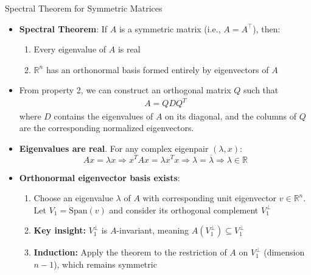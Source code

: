 \begin{frame}{Spectral Theorem for Symmetric Matrices}
\begin{itemize}
    \item  \textbf{Spectral Theorem}: If \( A \) is a symmetric matrix (i.e., \( A = A^\top \)), then:
     \begin{enumerate}
          \item Every eigenvalue of \( A \) is real
          \item \( \mathbb{R}^n \) has an orthonormal basis formed entirely by eigenvectors of \( A \)
     \end{enumerate}
     \item  From property 2, we can construct an orthogonal matrix $Q$ such that 
          \begin{align}
                A = Q D Q^T
          \end{align}
          where $D$ contains the eigenvalues of $A$ on its diagonal, and the columns of $Q$ are the corresponding normalized eigenvectors.
\end{itemize}
\end{frame}
\begin{frame}{}
\begin{itemize}
     \item \textbf{Eigenvalues are real}. For any complex eigenpair $(\lambda, x)$:
     \[
     Ax = \lambda x \Rightarrow x^T A x = \lambda x^T x \Rightarrow \lambda = \overline{\lambda} \Rightarrow \lambda \in \mathbb{R}
     \]
     \item \textbf{Orthonormal eigenvector basis exists}:
     \begin{enumerate}
          \item  Choose an eigenvalue \( \lambda \) of \( A \) with corresponding unit eigenvector \( v \in \mathbb{R}^n \). Let \( V_1 = \text{Span}(v) \) and consider its orthogonal complement \( V_1^\perp \)

          \item \textbf{Key insight:} \( V_1^\perp \) is \( A \)-invariant, meaning \( A(V_1^\perp) \subseteq V_1^\perp \)
          \item \textbf{Induction:} Apply the theorem to the restriction of \( A \) on \( V_1^\perp \) (dimension \( n-1 \)), which remains symmetric
          \end{enumerate}
\end{itemize}
\end{frame}




